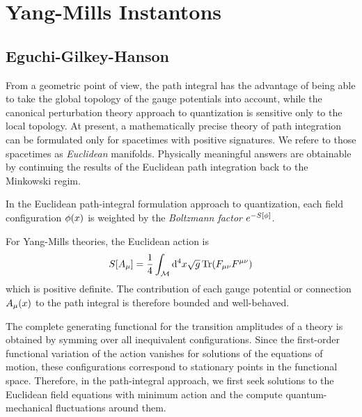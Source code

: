 \section{Yang-Mills Instantons}
\subsection{Eguchi-Gilkey-Hanson}
From a geometric point of view, the path integral has the advantage of being able to take the global topology of the gauge potentials into account, while the canonical perturbation theory approach to quantization is sensitive only to the local topology. At present, a mathematically precise theory of path integration can be formulated only for spacetimes with positive signatures. We refere to those spacetimes as \textit{Euclidean} manifolds. Physically meaningful answers are obtainable by continuing the results of the Euclidean path integration back to the Minkowski regim.

In the Euclidean path-integral formulation approach to quantization, each field configuration $\phi(x)$ is weighted by the \textit{Boltzmann factor} $e^{-S[\phi ]}$.

For Yang-Mills theories, the Euclidean action is
\begin{equation}
  S[A_\mu ]=\frac{1}{4}\int_{\mathcal{M}}\dd^4x\sqrt{g}\Tr(F_{\mu\nu }F^{\mu\nu })
\end{equation}
which is positive definite. The contribution of each gauge potential or connection $A_\mu (x)$ to the path integral is therefore bounded and well-behaved.

The complete generating functional for the transition amplitudes of a theory is obtained by symming over all inequivalent configurations. Since the first-order functional variation of the action vanishes for solutions of the equations of motion, these configurations correspond to stationary points in the functional space. Therefore, in the path-integral approach, we first seek solutions to the Euclidean field equations with minimum action and the compute quantum-mechanical fluctuations around them.




